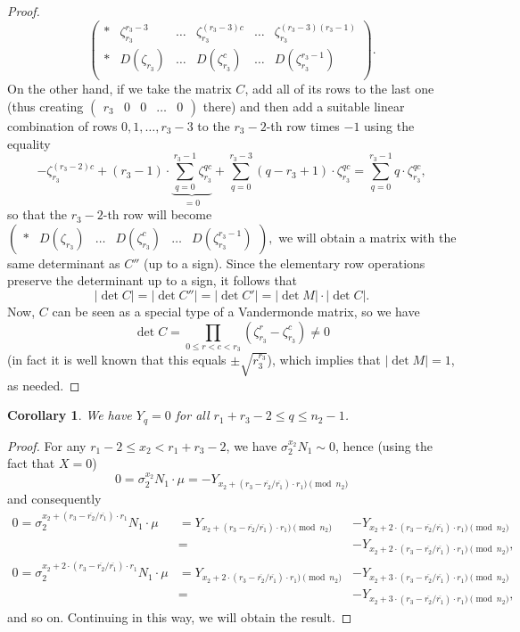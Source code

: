 \documentclass[12pt,a4paper]{article}
\newtheorem{cor}[theorem]{Corollary}
\theoremstyle{definition}
\newcommand{\zt}{\zeta_{r_3}}
\newcommand{\uo}{\overline{r_2}}
\newcommand{\vo}{\overline{r_1}}
\begin{document}
\begin{proof}
$$\begin{pmatrix}
*& \zt^{r_3-3}& \dots & \zt^{(r_3-3)c} & \dots & \zt^{(r_3-3)(r_3-1)}\\ 
*& D(\zt)& \dots & D(\zt^c) & \dots & D(\zt^{r_3-1})\\ 
\end{pmatrix}.
$$
On the other hand, if we take the matrix $C$, add all of its rows to the last one (thus creating $\begin{pmatrix}
r_3 & 0 & 0& \dots &0
\end{pmatrix}$
there) and then add a suitable linear combination of rows $0,1,\dots, r_3-3$ to the $r_3-2$-th row times $-1$ using the equality
$$-\zt^{(r_3-2)c}+(r_3-1)\cdot\underbrace{\sum_{q=0}^{r_3-1}\zt^{qc}}_{=0}+\sum_{q=0}^{r_3-3}(q-r_3+1)\cdot\zt^{qc}=\sum_{q=0}^{r_3-1}q\cdot\zt^{qc},$$
so that the $r_3-2$-th row will become
$\begin{pmatrix}
*& D(\zt)& \dots & D(\zt^c) & \dots & D(\zt^{r_3-1})
\end{pmatrix},$
we will obtain a matrix with the same determinant as $C''$ (up to a sign). Since the elementary row operations preserve the determinant up to a sign, it follows that
$$|\det C|=|\det C''|=|\det C'|=|\det M|\cdot |\det C|.$$ 
Now, $C$ can be seen as a special type of a Vandermonde matrix, so we have $$\det C=\prod_{0\leq r<c<r_3}(\zt^r-\zt^c)\neq 0$$
(in fact it is well known that this equals $\pm \sqrt{r_3^{r_3}}$), which implies that %
 $|\det M|=1$, as needed.
\end{proof}

\begin{cor}
We have $Y_q=0$ for all $r_1+r_3-2\leq q\leq n_2-1$.
\end{cor}
\begin{proof}
For any $r_1-2\leq x_2<r_1+r_3-2$, we have $\sigma_2^{x_2}N_1\sim 0$, hence (using the fact that $X=0$)
$$0=\sigma_2^{x_2}N_1 \cdot \mu=-Y_{x_2+(r_3-\uo/\vo)\cdot r_1)\pmod{n_2}}$$
and consequently
\begin{align*}
0=\sigma_2^{x_2+(r_3-\uo/\vo)\cdot r_1}N_1 \cdot \mu &=Y_{x_2+(r_3-\uo/\vo)\cdot r_1)\pmod{n_2}}&-Y_{x_2+2\cdot(r_3-\uo/\vo)\cdot r_1)\pmod{n_2}}\\
&=&-Y_{x_2+2\cdot(r_3-\uo/\vo)\cdot r_1)\pmod{n_2}},\\
0=\sigma_2^{x_2+2\cdot (r_3-\uo/\vo)\cdot r_1}N_1 \cdot \mu &=Y_{x_2+2\cdot(r_3-\uo/\vo)\cdot r_1)\pmod{n_2}}&-Y_{x_2+3\cdot(r_3-\uo/\vo)\cdot r_1)\pmod{n_2}}\\
&=&-Y_{x_2+3\cdot(r_3-\uo/\vo)\cdot r_1)\pmod{n_2}},
\end{align*}
and so on. Continuing in this way, we will obtain the result.

\end{proof}
\end{document}
